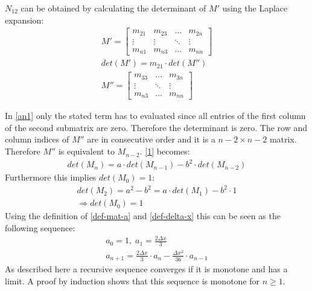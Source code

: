 \(N_{12}\) can be obtained by calculating the determinant of \(M'\) using the Laplace expansion:
\begin{gather}
M' = \begin{bmatrix}
m_{21} & m_{23} & \dots & m_{2n}\\
\vdots & \vdots & \ddots & \vdots \\
m_{n1} & m_{n3} & \dots & m_{nn}
\end{bmatrix} \\
det(M') = m_{21} \cdot det(M'') \label{an1} \\
M'' = \begin{bmatrix}
m_{33} & \dots & m_{3n}\\
\vdots & \ddots & \vdots \\
m_{n3} & \dots & m_{nn}
\end{bmatrix}
\end{gather}

In \ref{an1} only the stated term has to evaluated since all entries of the first column of the second submatrix are zero. 
Therefore the determinant is zero.
The row and column indices of \(M''\) are in consecutive order and it is a \(n-2 \times n-2\) matrix.
Therefore \(M''\) is equivalent to \(M_{n-2}\).
\ref{1} becomes:
\begin{gather}
det(M_n) = a \cdot det(M_{n-1}) - b^{2} \cdot det(M_{n-2})
\end{gather}
Furthermore this implies \(det(M_0) = 1\):
\begin{gather}
det(M_2) = a^{2} - b^{2} =  a \cdot det(M_1) - b^{2} \cdot 1 \\
\Rightarrow det(M_0) = 1
\end{gather}
Using the definition of \ref{def-mat-a} and \ref{def-delta-x} this can be seen as the following sequence:
\begin{gather}
a_0 = 1, \; a_1 = \frac{2 \Delta x}{3} \\
a_{n+1} = \frac{2 \Delta x}{3} \cdot a_{n} - \frac{\Delta x^2}{36} \cdot a_{n-1} 
\end{gather}
As described here \cite{Michael2017} a recursive sequence converges if it is monotone and has a limit.
A proof by induction shows that this sequence is monotone for \(n \geq 1\).


